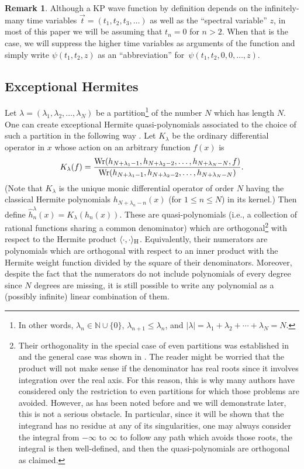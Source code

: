 \documentclass[pdftex]{sigma}
\numberwithin{equation}{section}
\theoremstyle{definition}
\newtheorem{Remark}[Theorem]{Remark}
\begin{document}
\begin{Remark}
 Although a KP wave function by definition depends on the
 infinitely-many time variables $\vec t=(t_1,t_2,t_3,\ldots)$ as well
 as the ``spectral variable'' $z$, in most of this paper we will be
 assuming that $t_n=0$ for $n>2$. When that is the case, we will
 suppress the higher time variables as arguments of the function and
 simply write
 $\psi(t_1,t_2,z)$ as an ``abbreviation'' for~${\psi(t_1,t_2, 0,0,\ldots,z)}$.
\end{Remark}

\subsection{Exceptional Hermites}\label{sec:exceptionals}

Let $\lambda=(\lambda_1,\lambda_2,\ldots,\lambda_N)$
be a partition\footnote{In other words, $\lambda_n\in\mathbb{N}\cup\{0\}$, $\lambda_{n+1}\leq
\lambda_n$, and $|\lambda|=\lambda_1+\lambda_2+\cdots+\lambda_N=N$.} of the number $N$ which has length $N$.
One can create exceptional Hermite quasi-polynomials
associated to the choice of such a partition
in
the following way \cite{XHermite1,XHermite2}. Let $K_{\lambda}$ be the ordinary differential
operator in $x$ whose action on an arbitrary function $f(x)$ is
\[
K_{\lambda}(f)=\frac{\hbox{Wr}(h_{N+\lambda_1-1},h_{N+\lambda_2-2},\ldots,h_{N+\lambda_N-N},f)}{\hbox{Wr}(h_{N+\lambda_1-1},h_{N+\lambda_2-2},\ldots,h_{N+\lambda_N-N})}.
\]
(Note that $K_{\lambda}$ is the unique monic differential operator of
order $N$ having the classical Hermite polynomials
$h_{N+\lambda_n-n}(x)$ (for $1\leq n\leq N$) in its kernel.)
Then define
$
\hat h_n^{\lambda}(x)=K_{\lambda}(h_n(x))$.
These are quasi-polynomials (i.e., a collection of rational functions
sharing a common denominator) which are orthogonal\footnote{Their
 orthogonality in the special case of even partitions was established
 in \cite{2014dry} and the general case was shown in \cite{HHV}.
The reader
 might be worried that the product will not make sense if the
 denominator has real roots since it involves integration over the
 real axis. For this reason, this is why many authors have
 considered only the restriction to even partitions for which those
 problems are avoided. However, as has
 been noted before \cite{HHV} and
 we will demonstrate later, this is not a serious obstacle. In
 particular, since it will be shown that the integrand has no residue
 at any of its singularities, one may always consider the integral from $-\infty$ to $\infty$
 to follow any path which avoids those roots, the integral is
 then well-defined, and then the quasi-polynomials are
 orthogonal as claimed.} with respect to the Hermite product
$\langle \cdot,\cdot\rangle_{\rm H}$. Equivalently, their numerators are
polynomials which are orthogonal with respect to an inner product
with the Hermite weight function divided by the square of their
denominators. Moreover, despite the fact that the
numerators do not include polynomials of every degree since $N$
degrees are missing, it is still
possible to write any polynomial as a (possibly infinite) linear
combination of them.
\end{document}
